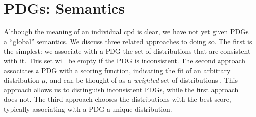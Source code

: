 \documentclass{article}
\theoremstyle{plain}
\theoremstyle{definition}
\theoremstyle{remark}
\numberwithin{equation}{section}
\begin{document}
\section{PDGs: Semantics}\label{sec:semantics}
Although the meaning of an individual cpd is clear, we have not yet given 
PDGs a ``global'' semantics. We discuss three related approaches to
doing so. The
first 
is the 
simplest: we associate with a PDG the set of distributions that are consistent
with it. This set will be empty if the PDG is inconsistent.
%
The second approach associates a PDG with a scoring function, indicating the fit
of an arbitrary distribution $\mu$, and can be thought of as a \emph{weighted}
set of distributions \cite{HL12}. This approach allows us to distinguish
inconsistent PDGs, while the first approach does not. The third approach chooses
the distributions with the best score, typically associating with a PDG a unique
distribution.
\end{document}
